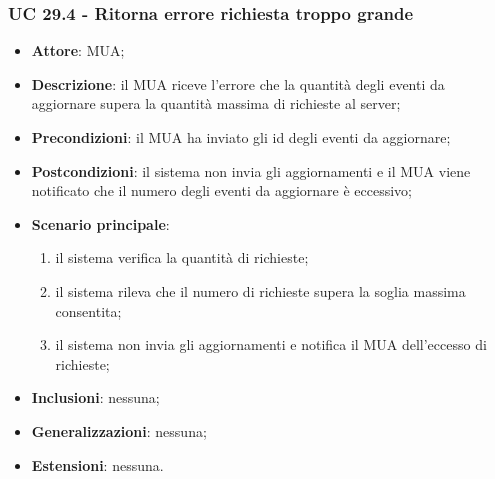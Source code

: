     \subsubsection{UC 29.4 - Ritorna errore richiesta troppo grande} \label{sec:UC29.4}
    \begin{itemize}
        \item \textbf{Attore}: MUA;
        \item \textbf{Descrizione}: il MUA riceve l'errore che la quantità degli eventi da aggiornare supera la quantità massima di richieste al server;
        \item \textbf{Precondizioni}: il MUA ha inviato gli id degli eventi da aggiornare;
        \item \textbf{Postcondizioni}: il sistema non invia gli aggiornamenti e il MUA viene notificato che il numero degli eventi da aggiornare è eccessivo;
        \item \textbf{Scenario principale}:
            \begin{enumerate}
                \item il sistema verifica la quantità di richieste;
                \item il sistema rileva che il numero di richieste supera la soglia massima consentita;
                \item il sistema non invia gli aggiornamenti e notifica il MUA dell'eccesso di richieste;
            \end{enumerate}
        \item \textbf{Inclusioni}: nessuna;
        \item \textbf{Generalizzazioni}: nessuna;
        \item \textbf{Estensioni}: nessuna.
    \end{itemize}

